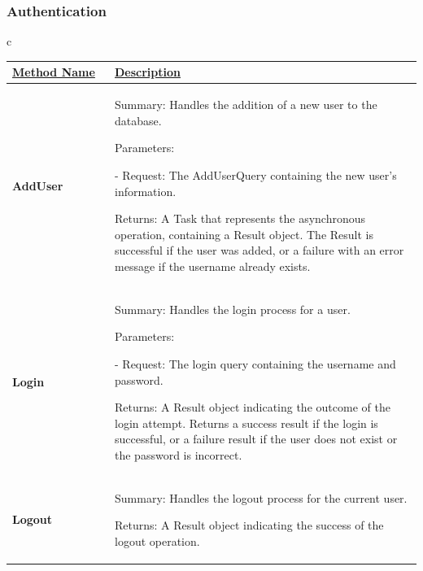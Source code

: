 \subsubsection{Authentication}
\begin{longtable}{c}
    \renewcommand{\arraystretch}{1.2}
    \begin{tabular}{|p{0.25\linewidth}|p{0.75\linewidth}|}
\hline
    \underline{Method Name} & \underline{Description} 
\\
\hline
    \textbf{AddUser} & Summary: Handles the addition of a new user to the database.
    
Parameters:

- Request: The AddUserQuery containing the new user's information.

Returns: A Task that represents the asynchronous operation, containing a Result object. The Result is successful if the user was added, or a failure with an error message if the username already exists.
\\
\hline
    \textbf{Login} & Summary: Handles the login process for a user.
    
Parameters:

- Request: The login query containing the username and password.

Returns: A Result object indicating the outcome of the login attempt. Returns a success result if the login is successful, or a failure result if the user does not exist or the password is  incorrect.
\\
\hline
    \textbf{Logout} & Summary: Handles the logout process for the current user.
    
Returns: A Result object indicating the success of the logout operation.
\\
        \hline
    \end{tabular}
\end{longtable}       



